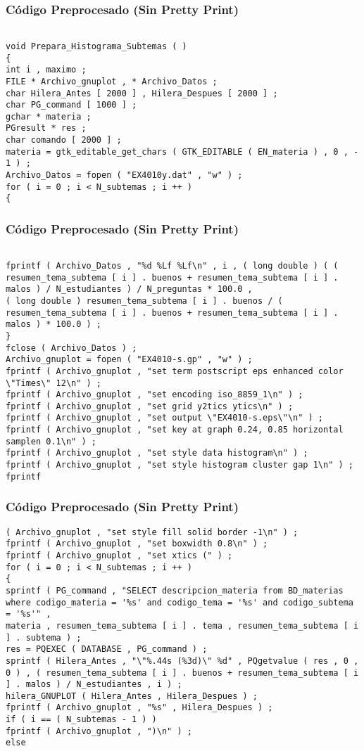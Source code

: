\documentclass{beamer}
\begin{document}
\begin{frame}[fragile]
\frametitle{C\'odigo Preprocesado (Sin Pretty Print)}
\begin{lstlisting}[style=CStyle]

void Prepara_Histograma_Subtemas ( ) 
{ 
int i , maximo ; 
FILE * Archivo_gnuplot , * Archivo_Datos ; 
char Hilera_Antes [ 2000 ] , Hilera_Despues [ 2000 ] ; 
char PG_command [ 1000 ] ; 
gchar * materia ; 
PGresult * res ; 
char comando [ 2000 ] ; 
materia = gtk_editable_get_chars ( GTK_EDITABLE ( EN_materia ) , 0 , - 1 ) ; 
Archivo_Datos = fopen ( "EX4010y.dat" , "w" ) ; 
for ( i = 0 ; i < N_subtemas ; i ++ ) 
{ \end{lstlisting}
\end{frame}
\begin{frame}[fragile]
\frametitle{C\'odigo Preprocesado (Sin Pretty Print)}
\begin{lstlisting}[style=CStyle]

fprintf ( Archivo_Datos , "%d %Lf %Lf\n" , i , ( long double ) ( ( resumen_tema_subtema [ i ] . buenos + resumen_tema_subtema [ i ] . malos ) / N_estudiantes ) / N_preguntas * 100.0 , 
( long double ) resumen_tema_subtema [ i ] . buenos / ( resumen_tema_subtema [ i ] . buenos + resumen_tema_subtema [ i ] . malos ) * 100.0 ) ; 
} 
fclose ( Archivo_Datos ) ; 
Archivo_gnuplot = fopen ( "EX4010-s.gp" , "w" ) ; 
fprintf ( Archivo_gnuplot , "set term postscript eps enhanced color \"Times\" 12\n" ) ; 
fprintf ( Archivo_gnuplot , "set encoding iso_8859_1\n" ) ; 
fprintf ( Archivo_gnuplot , "set grid y2tics ytics\n" ) ; 
fprintf ( Archivo_gnuplot , "set output \"EX4010-s.eps\"\n" ) ; 
fprintf ( Archivo_gnuplot , "set key at graph 0.24, 0.85 horizontal samplen 0.1\n" ) ; 
fprintf ( Archivo_gnuplot , "set style data histogram\n" ) ; 
fprintf ( Archivo_gnuplot , "set style histogram cluster gap 1\n" ) ; 
fprintf \end{lstlisting}
\end{frame}
\begin{frame}[fragile]
\frametitle{C\'odigo Preprocesado (Sin Pretty Print)}
\begin{lstlisting}[style=CStyle]
( Archivo_gnuplot , "set style fill solid border -1\n" ) ; 
fprintf ( Archivo_gnuplot , "set boxwidth 0.8\n" ) ; 
fprintf ( Archivo_gnuplot , "set xtics (" ) ; 
for ( i = 0 ; i < N_subtemas ; i ++ ) 
{ 
sprintf ( PG_command , "SELECT descripcion_materia from BD_materias where codigo_materia = '%s' and codigo_tema = '%s' and codigo_subtema = '%s'" , 
materia , resumen_tema_subtema [ i ] . tema , resumen_tema_subtema [ i ] . subtema ) ; 
res = PQEXEC ( DATABASE , PG_command ) ; 
sprintf ( Hilera_Antes , "\"%.44s (%3d)\" %d" , PQgetvalue ( res , 0 , 0 ) , ( resumen_tema_subtema [ i ] . buenos + resumen_tema_subtema [ i ] . malos ) / N_estudiantes , i ) ; 
hilera_GNUPLOT ( Hilera_Antes , Hilera_Despues ) ; 
fprintf ( Archivo_gnuplot , "%s" , Hilera_Despues ) ; 
if ( i == ( N_subtemas - 1 ) ) 
fprintf ( Archivo_gnuplot , ")\n" ) ; 
else \end{lstlisting}
\end{frame}
\end{document}
